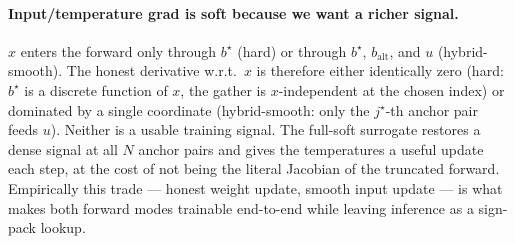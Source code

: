 \documentclass[11pt]{article}
\newcommand{\bstar}{b^{\star}}
\newcommand{\jstar}{j^{\star}}
\begin{document}
\paragraph{Input/temperature grad is soft because we want a richer signal.}
$x$ enters the forward only through $\bstar$ (hard) or through $\bstar$, $b_{\text{alt}}$, and $u$ (hybrid-smooth). The honest derivative w.r.t.\ $x$ is therefore either identically zero (hard: $\bstar$ is a discrete function of $x$, the gather is $x$-independent at the chosen index) or dominated by a single coordinate (hybrid-smooth: only the $\jstar$-th anchor pair feeds $u$). Neither is a usable training signal. The full-soft surrogate restores a dense signal at all $N$ anchor pairs and gives the temperatures a useful update each step, at the cost of not being the literal Jacobian of the truncated forward. Empirically this trade --- honest weight update, smooth input update --- is what makes both forward modes trainable end-to-end while leaving inference as a sign-pack lookup.
\end{document}

